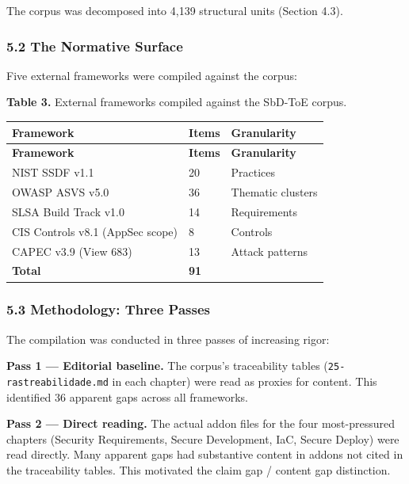 \documentclass[
]{article}
\begin{document}
The corpus was decomposed into 4,139 structural units (Section 4.3).

\subsubsection{5.2 The Normative Surface}\label{the-normative-surface}

Five external frameworks were compiled against the corpus:

\textbf{Table 3.} External frameworks compiled against the SbD-ToE
corpus.

\begin{longtable}{@{}L{4.6cm}R{1.4cm}L{4.4cm}@{}}
\toprule
\textbf{Framework} & \textbf{Items} & \textbf{Granularity} \\
\midrule
\endfirsthead
\toprule
\textbf{Framework} & \textbf{Items} & \textbf{Granularity} \\
\midrule
\endhead
\bottomrule
\endfoot
\bottomrule
\endlastfoot
NIST SSDF v1.1 & 20 & Practices \\
OWASP ASVS v5.0 & 36 & Thematic clusters \\
SLSA Build Track v1.0 & 14 & Requirements \\
CIS Controls v8.1 (AppSec scope) & 8 & Controls \\
CAPEC v3.9 (View 683) & 13 & Attack patterns \\
\textbf{Total} & \textbf{91} &  \\
\end{longtable}

\subsubsection{5.3 Methodology: Three
Passes}\label{methodology-three-passes}

The compilation was conducted in three passes of increasing rigor:

\textbf{Pass 1 --- Editorial baseline.} The corpus's traceability tables
(\texttt{25-rastreabilidade.md} in each chapter) were read as proxies
for content. This identified 36 apparent gaps across all frameworks.

\textbf{Pass 2 --- Direct reading.} The actual addon files for the four
most-pressured chapters (Security Requirements, Secure Development, IaC,
Secure Deploy) were read directly. Many apparent gaps had substantive
content in addons not cited in the traceability tables. This motivated
the claim gap / content gap distinction.
\end{document}
